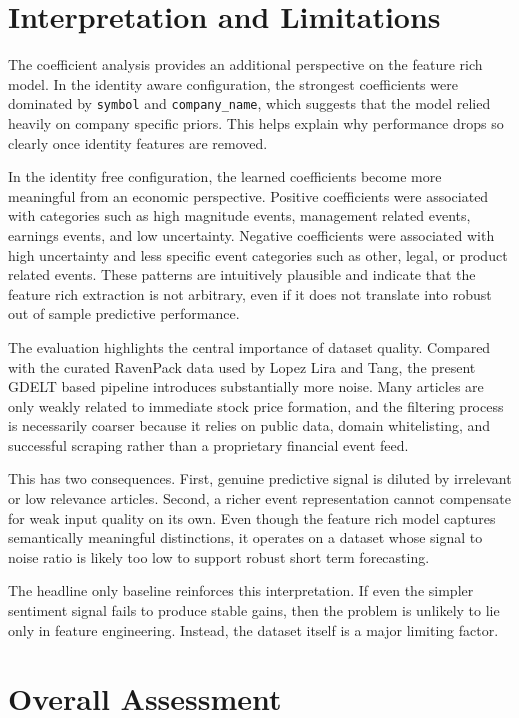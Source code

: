 \section{Interpretation and Limitations}

The coefficient analysis provides an additional perspective on the feature rich model. In the identity aware configuration, the strongest coefficients were dominated by \texttt{symbol} and \texttt{company\_name}, which suggests that the model relied heavily on company specific priors. This helps explain why performance drops so clearly once identity features are removed.

In the identity free configuration, the learned coefficients become more meaningful from an economic perspective. Positive coefficients were associated with categories such as high magnitude events, management related events, earnings events, and low uncertainty. Negative coefficients were associated with high uncertainty and less specific event categories such as other, legal, or product related events. These patterns are intuitively plausible and indicate that the feature rich extraction is not arbitrary, even if it does not translate into robust out of sample predictive performance.

The evaluation highlights the central importance of dataset quality. Compared with the curated RavenPack data used by Lopez Lira and Tang, the present GDELT based pipeline introduces substantially more noise. Many articles are only weakly related to immediate stock price formation, and the filtering process is necessarily coarser because it relies on public data, domain whitelisting, and successful scraping rather than a proprietary financial event feed.

This has two consequences. First, genuine predictive signal is diluted by irrelevant or low relevance articles. Second, a richer event representation cannot compensate for weak input quality on its own. Even though the feature rich model captures semantically meaningful distinctions, it operates on a dataset whose signal to noise ratio is likely too low to support robust short term forecasting.

The headline only baseline reinforces this interpretation. If even the simpler sentiment signal fails to produce stable gains, then the problem is unlikely to lie only in feature engineering. Instead, the dataset itself is a major limiting factor.

\section{Overall Assessment}

